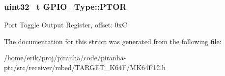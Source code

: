 \subsubsection[{\texorpdfstring{P\+T\+OR}{PTOR}}]{ uint32\+\_\+t G\+P\+I\+O\+\_\+\+Type\+::\+P\+T\+OR}\hypertarget{structGPIO__Type_aec9404442ba35916e2a747d2d0bf73de}{}\label{structGPIO__Type_aec9404442ba35916e2a747d2d0bf73de}
Port Toggle Output Register, offset\+: 0xC 

The documentation for this struct was generated from the following file\+:\begin{DoxyCompactItemize}
\item 
/home/erik/proj/piranha/code/piranha-\/ptc/src/receiver/mbed/\+T\+A\+R\+G\+E\+T\+\_\+\+K64\+F/M\+K64\+F12.\+h\end{DoxyCompactItemize}
